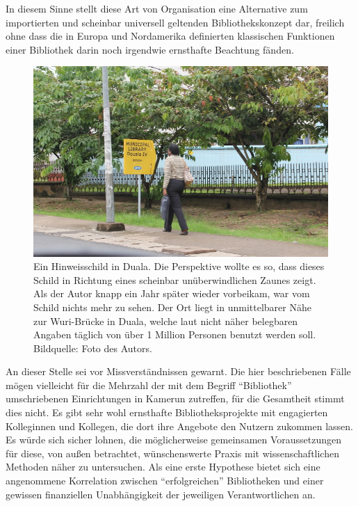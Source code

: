 \documentclass[a4paper,
fontsize=11pt,
oneside,
numbers=noperiodatend,
parskip=half-,
bibliography=totoc,
final
]{scrartcl}
\begin{document}
In diesem Sinne stellt diese Art von Organisation eine Alternative zum
importierten und scheinbar universell geltenden Bibliothekskonzept dar,
freilich ohne dass die in Europa und Nordamerika definierten klassischen
Funktionen einer Bibliothek darin noch irgendwie ernsthafte Beachtung
fänden.

\begin{figure}[htbp]
\centering
\includegraphics{img/LibDuala.jpg}
\caption{Ein Hinweisschild in Duala. Die Perspektive wollte es so, dass
dieses Schild in Richtung eines scheinbar unüberwindlichen Zaunes zeigt.
Als der Autor knapp ein Jahr später wieder vorbeikam, war vom Schild
nichts mehr zu sehen. Der Ort liegt in unmittelbarer Nähe zur
Wuri-Brücke in Duala, welche laut nicht näher belegbaren Angaben täglich
von über 1 Million Personen benutzt werden soll. Bildquelle: Foto des
Autors.}
\end{figure}

An dieser Stelle sei vor Missverständnissen gewarnt. Die hier
beschriebenen Fälle mögen vielleicht für die Mehrzahl der mit dem
Begriff \enquote{Bibliothek} umschriebenen Einrichtungen in Kamerun
zutreffen, für die Gesamtheit stimmt dies nicht. Es gibt sehr wohl
ernsthafte Bibliotheksprojekte mit engagierten Kolleginnen und Kollegen,
die dort ihre Angebote den Nutzern zukommen lassen. Es würde sich sicher
lohnen, die möglicherweise gemeinsamen Voraussetzungen für diese, von
außen betrachtet, wünschenswerte Praxis mit wissenschaftlichen Methoden
näher zu untersuchen. Als eine erste Hypothese bietet sich eine
angenommene Korrelation zwischen \enquote{erfolgreichen} Bibliotheken
und einer gewissen finanziellen Unabhängigkeit der jeweiligen
Verantwortlichen an.
\end{document}
